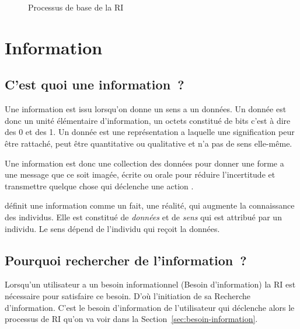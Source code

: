 \begin{figure}[htbp]
    \begin{center}
    \end{center}
    \caption{Processus de base de la RI \citep{amelioration-ri-approche-semantique}}\label{fig:processus-ri}
\end{figure}

\section{Information}
\subsection{C'est quoi une information~?}
Une information est issu lorsqu'on donne un sens a un données. Un donnée est donc un unité élémentaire d'information, un octets constitué de bits c'est à dire des 0 et des 1. Un donnée est une représentation a laquelle une signification peur être rattaché, peut être quantitative ou qualitative et n'a pas de sens elle-même.

Une information est donc une collection des données pour donner une forme a une message que ce soit imagée, écrite ou orale pour réduire l’incertitude et transmettre quelque chose qui déclenche une action \citep*{thesaurus-ir-web, construction-memoire-organisationnel-benayache}.

\citeauthor{j-velo:sys-user} \citep{j-velo:sys-user} définit une information comme un fait, une réalité, qui augmente la connaissance des individus. Elle est constitué de \textit{données} et de \textit{sens} qui est attribué par un individu. Le sens dépend de l'individu qui reçoit la données.

\subsection{Pourquoi rechercher de l'information~?}
Lorsqu'un utilisateur a un besoin informationnel (Besoin d'information) la RI est nécessaire pour satisfaire ce besoin. D'où l'initiation de sa Recherche d'information. C'est le besoin d'information de l'utilisateur qui déclenche alors le processus de RI qu'on va voir dans la Section~\ref{sec:besoin-information}.

